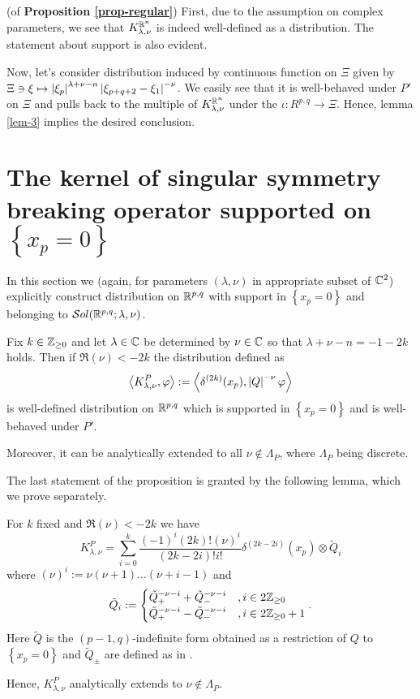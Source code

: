 \documentclass[10pt]{article} %
\theoremstyle{definition}
\theoremstyle{remark}
\begin{document}
\begin{myproof}(of {\bf Proposition \ref{prop-regular}})\newline
	First, due to the assumption on complex parameters, we see that $K_{ \lambda,\nu }^{ \mathbb{R}^n }$ is indeed well-defined as a
	distribution. The statement about support is also evident.\par
	Now, let's consider distribution induced by continuous function on $\Xi$ given by
	$\Xi\ni\xi\mapsto\left|\xi_p\right|^{\lambda+\nu-n}\left|\xi_{p+q+2}-\xi_1\right|^{-\nu}$. We easily see that 
	it is well-behaved under $P'$ on $\Xi$ and pulls back to the multiple of $K_{ \lambda,\nu }^{ \mathbb{R}^n }$
	under the $\iota:R^{p,q}\to\Xi$. Hence,
	lemma \ref{lem-3} implies the desired conclusion.
\end{myproof}
\section{The kernel of singular symmetry breaking operator supported on $\left\{ x_p=0 \right\}$}
In this section we (again, for parameters $(\lambda,\nu)$ in appropriate subset of $\mathbb{C}^2$)
explicitly construct distribution on $\mathbb{R}^{p,q}$ with support in $\left\{ x_p=0 \right\}$ and belonging to $\mathcal{S}ol(\mathbb{R}^{p,q};\lambda,\nu)$.
\begin{myprop}\label{prop:supp_p}
	Fix $k\in\mathbb{Z}_{\ge0}$ and let $\lambda\in\mathbb{C}$ be determined by $\nu\in\mathbb{C}$ so that $\lambda+\nu-n=-1-2k$ holds.
	Then if $\Re(\nu)<-2k$ the distribution defined as
	\[\left<K_{\lambda,\nu}^P,\varphi\right>:=\left<\delta^{(2k)}(x_p),\left|Q\right|^{-\nu}\varphi\right>\]
	is well-defined distribution on $\mathbb{R}^{p,q}$ which is supported in $\left\{ x_p=0 \right\}$ and is well-behaved
	under $P'$.

	Moreover, it can be analytically extended to all $\nu\notin\Lambda_P$, where $\Lambda_P$ being discrete.
\end{myprop}
The last statement of the proposition is granted by the following lemma, which we prove separately.
\begin{mylem}\label{lem:supp_p}
	For $k$ fixed and $\Re(\nu)<-2k$ we have
	\begin{equation}
	K^{P}_{\lambda,\nu}
	=\sum_{i=0}^k\frac{(-1)^i(2k)!(\nu)^i}{(2k-2i)!i!}
	\delta^{(2k-2i)}(x_p)\otimes \tilde{Q}_i
		\label{eq:supp_p_mero}
	\end{equation}
	where $(\nu)^{i}:=\nu(\nu+1)\dots(\nu+i-1)$ and
	\[\tilde{Q}_i:=\begin{cases}
			\tilde{Q}_+^{-\nu-i}+\tilde{Q}_-^{-\nu-i}&, i\in2\mathbb{Z}_{\ge0}\\
			\tilde{Q}_+^{-\nu-i}-\tilde{Q}_-^{-\nu-i}&, i\in2\mathbb{Z}_{\ge0}+1
	\end{cases}.\]
	Here $\tilde{Q}$ is the $(p-1,q)$-indefinite form obtained as a restriction of $Q$ to $\left\{ x_p=0 \right\}$ and
	$\tilde{Q}_{\pm}$ are defined as in \cite[sec. III.2.2]{gelfand1980distribution}.

	Hence, $K_{\lambda,\nu}^P$ analytically extends to $\nu\notin\Lambda_P$.
\end{mylem}
\end{document}

